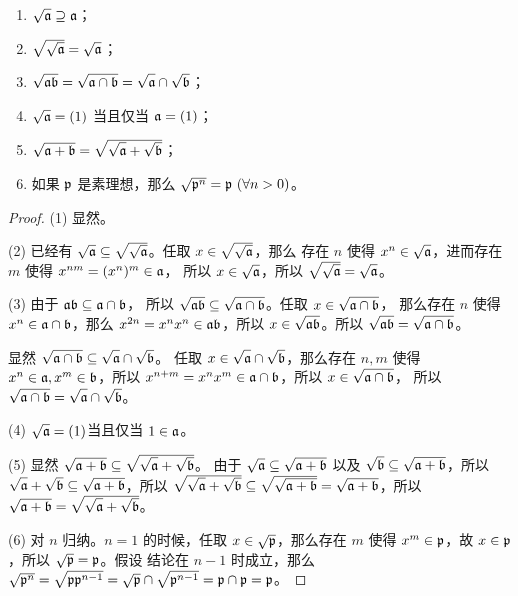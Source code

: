 \begin{proposition}
  \mbox{}
  \begin{enumerate}
    \item $\sqrt{\mathfrak{a}}\supseteq\mathfrak{a}$；
    \item $\sqrt{\sqrt{\mathfrak{a}}}=\sqrt{\mathfrak{a}}$；
    \item $\sqrt{\mathfrak{ab}}=\sqrt{\mathfrak{a}\cap\mathfrak{b}}=\sqrt{\mathfrak{a}\vphantom{b}}\cap\sqrt{\mathfrak{b}}$；
    \item $\sqrt{\mathfrak{a}}=(1)$ 当且仅当 $\mathfrak{a}=(1)$；
    \item $\sqrt{\mathfrak{a}+\mathfrak{b}}=\sqrt{\sqrt{\mathfrak{a}\vphantom{b}}+\sqrt{\mathfrak{b}}}$；
    \item 如果 $\mathfrak{p}$ 是素理想，那么 $\sqrt{\mathfrak{p}^n}=\mathfrak{p}\ (\forall n>0)$。
  \end{enumerate}
\end{proposition}
\begin{proof}
  (1) 显然。

  (2) 已经有 $\sqrt{\mathfrak{a}}\subseteq\sqrt{\sqrt{\mathfrak{a}}}$。任取 $x\in\sqrt{\sqrt{\mathfrak{a}}}$，那么
  存在 $n$ 使得 $x^n\in\sqrt{\mathfrak{a}}$，进而存在 $m$ 使得 $x^{nm}=(x^n)^m\in\mathfrak{a}$，
  所以 $x\in\sqrt{\mathfrak{a}}$，所以 $\sqrt{\sqrt{\mathfrak{a}}}=\sqrt{\mathfrak{a}}$。

  (3) 由于 $\mathfrak{a}\mathfrak{b}\subseteq\mathfrak{a}\cap\mathfrak{b}$，
  所以 $\sqrt{\mathfrak{ab}}\subseteq\sqrt{\mathfrak{a}\cap\mathfrak{b}}$。任取 $x\in\sqrt{\mathfrak{a}\cap\mathfrak{b}}$，
  那么存在 $n$ 使得 $x^n\in\mathfrak{a}\cap\mathfrak{b}$，那么 $x^{2n}=x^nx^n\in\mathfrak{a}\mathfrak{b}$，所以
  $x\in\sqrt{\mathfrak{ab}}$。所以 $\sqrt{\mathfrak{ab}}=\sqrt{\mathfrak{a}\cap\mathfrak{b}}$。

  显然 $\sqrt{\mathfrak{a}\cap\mathfrak{b}}\subseteq\sqrt{\mathfrak{a}\vphantom{b}}\cap\sqrt{\mathfrak{b}}$。
  任取 $x\in\sqrt{\mathfrak{a}\vphantom{b}}\cap\sqrt{\mathfrak{b}}$，那么存在 $n,m$ 使得
  $x^n\in\mathfrak{a},x^m\in\mathfrak{b}$，所以 $x^{n+m}=x^nx^m\in\mathfrak{a}\cap\mathfrak{b}$，所以
  $x\in\sqrt{\mathfrak{a}\cap\mathfrak{b}}$，
  所以 $\sqrt{\mathfrak{a}\cap\mathfrak{b}}=\sqrt{\mathfrak{a}\vphantom{b}}\cap\sqrt{\mathfrak{b}}$。

  (4) $\sqrt{\mathfrak{a}}=(1)$当且仅当 $1\in\mathfrak{a}$。

  (5) 显然 $\sqrt{\mathfrak{a}+\mathfrak{b}}\subseteq\sqrt{\sqrt{\mathfrak{a}\vphantom{b}}+\sqrt{\mathfrak{b}}}$。
  由于 $\sqrt{\mathfrak{a}}\subseteq\sqrt{\mathfrak{a}+\mathfrak{b}}$ 以及
  $\sqrt{\mathfrak{b}}\subseteq\sqrt{\mathfrak{a}+\mathfrak{b}}$，所以
  $\sqrt{\mathfrak{a}\vphantom{b}}+\sqrt{\mathfrak{b}}\subseteq\sqrt{\mathfrak{a}+\mathfrak{b}}$，所以
  $\sqrt{\sqrt{\mathfrak{a}\vphantom{b}}+\sqrt{\mathfrak{b}}}\subseteq\sqrt{\sqrt{\mathfrak{a}+\mathfrak{b}}}
  =\sqrt{\mathfrak{a}+\mathfrak{b}}$，所以
  $\sqrt{\mathfrak{a}+\mathfrak{b}}=\sqrt{\sqrt{\mathfrak{a}\vphantom{b}}+\sqrt{\mathfrak{b}}}$。

  (6) 对 $n$ 归纳。$n=1$ 的时候，任取 $x\in\sqrt{\mathfrak{p}}$，那么存在 $m$ 使得
  $x^m\in\mathfrak{p}$，故 $x\in\mathfrak{p}$，所以 $\sqrt{\mathfrak{p}}=\mathfrak{p}$。假设
  结论在 $n-1$ 时成立，那么 $\sqrt{\mathfrak{p}^n}=\sqrt{\mathfrak{p}\mathfrak{p}^{n-1}}
  =\sqrt{\mathfrak{p}}\cap \sqrt{\mathfrak{p}^{n-1}}=\mathfrak{p}\cap \mathfrak{p}=\mathfrak{p}$。
\end{proof}

